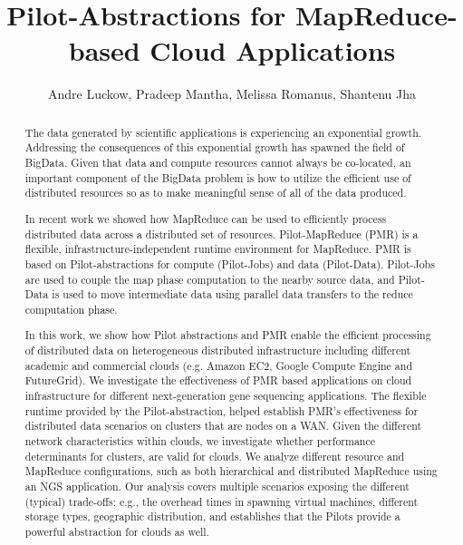\documentclass[times]{cpeauth}
\newcommand{\clouds}{clouds\xspace}
\newcommand{\pilot}{Pilot\xspace}
\newcommand{\pilots}{Pilots\xspace}
\begin{document}

\title{Pilot-Abstractions for MapReduce-based Cloud Applications}



\author{Andre Luckow, Pradeep Mantha, Melissa Romanus, Shantenu
  Jha\corrauth}

\address{Radical Research Group, Rutgers University}


\begin{abstract}
The data generated by scientific applications is experiencing an
exponential growth. Addressing the consequences of this exponential
growth has spawned the field of BigData. Given that data and compute
resources cannot always be co-located, an important component of the
BigData problem is how to utilize the efficient use of distributed
resources so as to make meaningful sense of all of the data produced.

In recent work we showed how MapReduce can be used to efficiently
process distributed data across a distributed set of resources.
Pilot-MapReduce (PMR) is a flexible, infrastructure-independent
runtime environment for MapReduce. PMR is based on \pilot-abstractions
for compute (Pilot-Jobs) and data (Pilot-Data). Pilot-Jobs are used to
couple the map phase computation to the nearby source data, and
Pilot-Data is used to move intermediate data using parallel data
transfers to the reduce computation phase.

In this work, we show how Pilot abstractions and PMR enable the
efficient processing of distributed data on heterogeneous distributed
infrastructure including different academic and commercial clouds
(e.g. Amazon EC2, Google Compute Engine and FutureGrid). We
investigate the effectiveness of PMR based applications on cloud
infrastructure for different next-generation gene sequencing
applications.  The flexible runtime provided by the Pilot-abstraction,
helped establish PMR's effectiveness for distributed data scenarios on
clusters that are nodes on a WAN. Given the different network
characteristics within clouds, we investigate whether performance
determinants for clusters, are valid for clouds.  We analyze different
resource and MapReduce configurations, such as both hierarchical and
distributed MapReduce using an NGS application.  Our analysis covers
multiple scenarios exposing the different (typical) trade-offs: e.g.,
the overhead times in spawning virtual machines, different storage
types, geographic distribution, and establishes that the \pilots
provide a powerful abstraction for \clouds as well.
\end{abstract}
\end{document}
